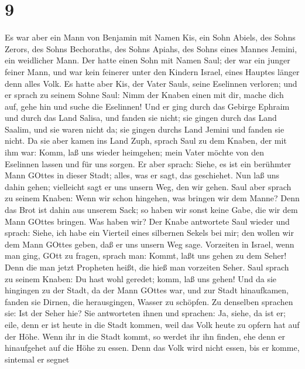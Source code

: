 \hypertarget{section-8}{%
\section{9}\label{section-8}}

 Es war aber ein Mann von Benjamin mit Namen Kis, ein Sohn
Abiels, des Sohns Zerors, des Sohns Bechoraths, des Sohns Apiahs, des
Sohns eines Mannes Jemini, ein weidlicher Mann.  Der hatte
einen Sohn mit Namen Saul; der war ein junger feiner Mann, und war kein
feinerer unter den Kindern Israel, eines Hauptes länger denn alles Volk.
 Es hatte aber Kis, der Vater Sauls, seine Eselinnen
verloren; und er sprach zu seinem Sohne Saul: Nimm der Knaben einen mit
dir, mache dich auf, gehe hin und suche die Eselinnen!  Und
er ging durch das Gebirge Ephraim und durch das Land Salisa, und fanden
sie nicht; sie gingen durch das Land Saalim, und sie waren nicht da; sie
gingen durchs Land Jemini und fanden sie nicht.  Da sie aber
kamen ins Land Zuph, sprach Saul zu dem Knaben, der mit ihm war: Komm,
laß uns wieder heimgehen; mein Vater möchte von den Eselinnen lassen und
für uns sorgen.  Er aber sprach: Siehe, es ist ein berühmter
Mann GOttes in dieser Stadt; alles, was er sagt, das geschiehet. Nun laß
uns dahin gehen; vielleicht sagt er uns unsern Weg, den wir gehen.
 Saul aber sprach zu seinem Knaben: Wenn wir schon hingehen,
was bringen wir dem Manne? Denn das Brot ist dahin aus unserem Sack; so
haben wir sonst keine Gabe, die wir dem Mann GOttes bringen. Was haben
wir?  Der Knabe antwortete Saul wieder und sprach: Siehe,
ich habe ein Vierteil eines silbernen Sekels bei mir; den wollen wir dem
Mann GOttes geben, daß er uns unsern Weg sage.  Vorzeiten in
Israel, wenn man ging, GOtt zu fragen, sprach man: Kommt, laßt uns gehen
zu dem Seher! Denn die man jetzt Propheten heißt, die hieß man vorzeiten
Seher.  Saul sprach zu seinem Knaben: Du hast wohl geredet;
komm, laß uns gehen! Und da sie hingingen zu der Stadt, da der Mann
GOttes war,  und zur Stadt hinaufkamen, fanden sie Dirnen,
die herausgingen, Wasser zu schöpfen. Zu denselben sprachen sie: Ist der
Seher hie?  Sie antworteten ihnen und sprachen: Ja, siehe,
da ist er; eile, denn er ist heute in die Stadt kommen, weil das Volk
heute zu opfern hat auf der Höhe.  Wenn ihr in die Stadt
kommt, so werdet ihr ihn finden, ehe denn er hinaufgehet auf die Höhe zu
essen. Denn das Volk wird nicht essen, bis er komme, sintemal er segnet
